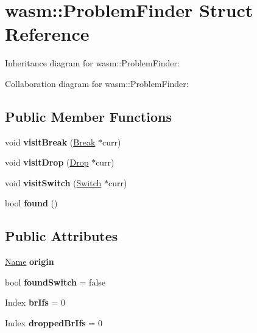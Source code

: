 \hypertarget{structwasm_1_1_problem_finder}{}\section{wasm\+:\+:Problem\+Finder Struct Reference}
\label{structwasm_1_1_problem_finder}


Inheritance diagram for wasm\+:\+:Problem\+Finder\+:


Collaboration diagram for wasm\+:\+:Problem\+Finder\+:
\subsection*{Public Member Functions}
\begin{DoxyCompactItemize}
\item 
\mbox{\label{structwasm_1_1_problem_finder_ae9d69d3a46f5277c15775040757a6ff9}} 
void {\bfseries visit\+Break} (\mbox{\hyperlink{classwasm_1_1_break}{Break}} $\ast$curr)
\item 
\mbox{\label{structwasm_1_1_problem_finder_ae73551f34398e88feef017d3220b43fb}} 
void {\bfseries visit\+Drop} (\mbox{\hyperlink{classwasm_1_1_drop}{Drop}} $\ast$curr)
\item 
\mbox{\label{structwasm_1_1_problem_finder_a179d5ca42bcedeace5ea212f820f8fcd}} 
void {\bfseries visit\+Switch} (\mbox{\hyperlink{classwasm_1_1_switch}{Switch}} $\ast$curr)
\item 
\mbox{\label{structwasm_1_1_problem_finder_a2c62d08824d2f2e597c4ba8186f39787}} 
bool {\bfseries found} ()
\end{DoxyCompactItemize}
\subsection*{Public Attributes}
\begin{DoxyCompactItemize}
\item 
\mbox{\label{structwasm_1_1_problem_finder_a82d2efe0d2f21a9293ee7dffff4add46}} 
\mbox{\hyperlink{structwasm_1_1_name}{Name}} {\bfseries origin}
\item 
\mbox{\label{structwasm_1_1_problem_finder_a2a308bad1e8e1c3e88f5a26314b977d1}} 
bool {\bfseries found\+Switch} = false
\item 
\mbox{\label{structwasm_1_1_problem_finder_add938fb531cc6eb07c5dbb02778520cb}} 
Index {\bfseries br\+Ifs} = 0
\item 
\mbox{\label{structwasm_1_1_problem_finder_aa4e0f4469c71117e4fab4aa519b93b55}} 
Index {\bfseries dropped\+Br\+Ifs} = 0
\end{DoxyCompactItemize}
